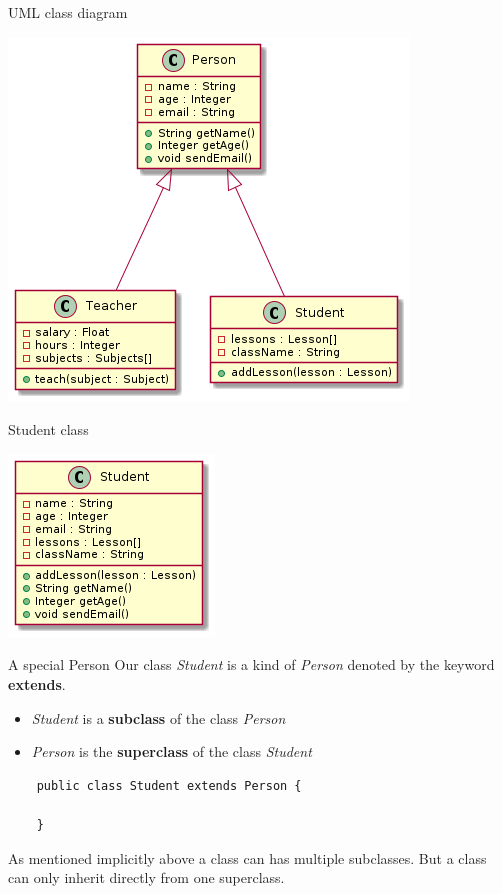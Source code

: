 \begin{frame}{UML class diagram}
	\begin{center}
		\includegraphics[height=.8\textheight]{04-inheritance/student_teacher.png}
	\end{center}	
\end{frame}

\begin{frame}{Student class}
	\begin{center}
		\includegraphics[height=.8\textheight]{04-inheritance/student.png}
	\end{center}	
\end{frame}


\begin{frame}[fragile]{A special Person}
	Our class \emph{Student} is a kind of \emph{Person} denoted by the keyword \textbf{extends}.
	\begin{itemize}
		\item \emph{Student} is a \textbf{subclass} of the class \emph{Person}
		\item \emph{Person} is the \textbf{superclass} of the class \emph{Student}
	\end{itemize}
	\begin{lstlisting}
	public class Student extends Person {
	
	}
	\end{lstlisting}
	\vfill
	As mentioned implicitly above a class can has multiple subclasses. 
	But a class can only inherit directly from one superclass.
\end{frame}

